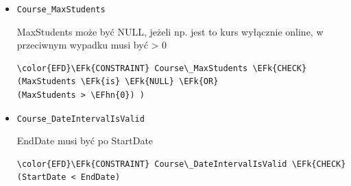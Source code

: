 \documentclass[11pt]{article}
\newcommand{\EFk}[1]{\textcolor{EFk}{\textbf{#1}}} %
\newcommand{\EFhn}[1]{\textcolor{EFhn}{#1}} %
\begin{document}
\begin{itemize}
\item \texttt{Course\_MaxStudents}

MaxStudents może być NULL, jeżeli np. jest to kurs wyłącznie online, w przeciwnym wypadku musi być > 0
\begin{Code}
\begin{Verbatim}
\color{EFD}\EFk{CONSTRAINT} Course\_MaxStudents \EFk{CHECK}
(MaxStudents \EFk{is} \EFk{NULL} \EFk{OR}
(MaxStudents > \EFhn{0}) )
\end{Verbatim}
\end{Code}
\item \texttt{Course\_DateIntervalIsValid}

EndDate musi być po StartDate
\begin{Code}
\begin{Verbatim}
\color{EFD}\EFk{CONSTRAINT} Course\_DateIntervalIsValid \EFk{CHECK}
(StartDate < EndDate)
\end{Verbatim}
\end{Code}
\end{itemize}
\end{document}
